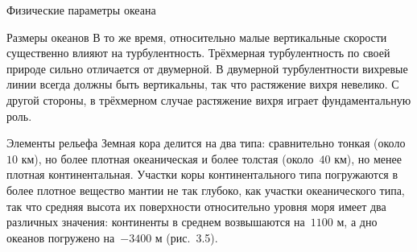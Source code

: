 \begin{chapter}{Физические параметры океана}
\begin{section}{Размеры океанов}
В то же время, относительно малые вертикальные скорости существенно влияют
на турбулентность. Трёхмерная турбулентность по своей природе сильно
отличается от двумерной. В двумерной турбулентности вихревые линии
всегда должны быть вертикальны, так что растяжение вихря невелико.
С другой стороны, в трёхмерном случае растяжение вихря
играет фундаментальную роль.
%

\end{section}

\begin{section}{Элементы рельефа}
Земная кора делится на два типа: сравнительно тонкая (около~$10\mbox{~км}$), 
но более плотная океаническая и более толстая (около~$40\mbox{~км}$), но
менее плотная континентальная. Участки коры континентального типа погружаются
в более плотное вещество мантии не так глубоко, как участки океанического типа,
так что средняя высота их поверхности относительно уровня моря имеет два
различных значения: континенты в среднем возвышаются на~$1100\mbox{~м}$, 
а дно океанов погружено на~$-3400\mbox{~м}$ (рис.~3.5).
%


\end{section}
\end{chapter}
